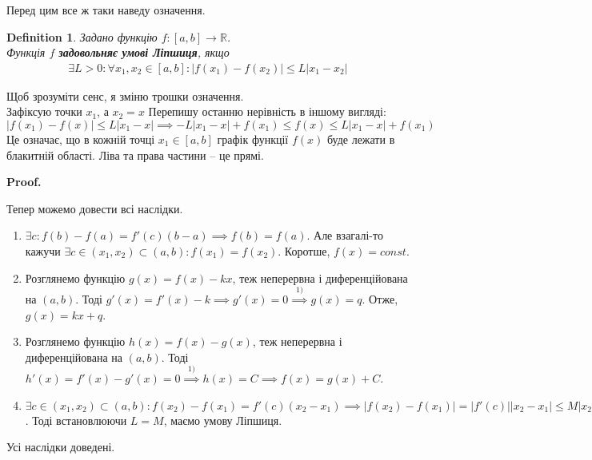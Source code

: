 \documentclass[a4paper, 14pt]{article}
\makeatletter
\def\qed{$\blacksquare$}
\theoremstyle{theoremdd}
\theoremstyle{theoremdd}
\newtheorem{definition}[theorem]{Definition}
\theoremstyle{theoremdd}
\theoremstyle{theoremdd}
\theoremstyle{theoremdd}
\theoremstyle{theoremdd}
\theoremstyle{theoremdd}
\theoremstyle{theoremdd}
\renewenvironment{proof}[1][Proof.\\]{\par
\pushQED{\hfill \qed}%
\normalfont \topsep6\p@\@plus6\p@\relax
\trivlist
\item\relax
{\bfseries
#1\@addpunct{.}}\hspace\labelsep\ignorespaces
}{%
\popQED\endtrivlist\@endpefalse
}
\makeatother
\begin{document}
Перед цим все ж таки наведу означення.
\begin{definition}
Задано функцію $f \colon [a,b] \to \mathbb{R}$.\\
Функція $f$ \textbf{задовольняє умові Ліпшиця}, якщо
\begin{align*}
\exists L > 0: \forall x_1,x_2 \in [a,b]: |f(x_1)-f(x_2)| \leq L|x_1-x_2|
\end{align*}
\end{definition}
Щоб зрозуміти сенс, я зміню трошки означення.\\
Зафіксую точки $x_1$, а $x_2 = x$ Перепишу останню нерівність в іншому вигляді:\\
$|f(x_1)-f(x)| \leq L|x_1-x| \implies -L|x_1-x|+f(x_1) \leq f(x) \leq L|x_1-x|+f(x_1) $\\
Це означає, що в кожній точці $x_1 \in [a,b]$ графік функції $f(x)$ буде лежати в блакитній області. Ліва та права частини -- це прямі.
\\ \iffalse %
\begin{figure}[H]
\centering
\begin{tikzpicture}[scale=0.8]
\draw[domain=-0.5:4.5, name path = A, samples=100, variable = \x] plot({\x},{3+abs(2-\x)});
\draw[domain=-0.5:4.5, name path = C, samples=100, variable = \x] plot({\x},{3-abs(2-\x)});

\draw[name path = B, white] (-0.5,5.5)--(-1,5.5)--(-3,5.5);
\draw[name path = D, white] (-0.5,0.5)--(-1,0)--(-3,0);
\tikzfillbetween[of=A and C]{blue, opacity = 0.3};
\tikzfillbetween[of=B and D]{blue, opacity = 0.3};
\draw (-0.5,0.5)--(-1,0);
\draw[red,domain=-3:4.5, variable = \x] plot({\x},{sqrt(\x*\x+5)});
\draw[thick,->] (0,0)--(0,5.5) node[anchor = south east] {$y$};
\draw[thick,->] (-3,0)--(4.5,0) node[anchor = north west] {$x$};
\end{tikzpicture}
\end{figure}
\fi %

\begin{proof}
Тепер можемо довести всі наслідки.
\begin{enumerate}[wide=0pt,label={\arabic*)}]
\item $\exists c: f(b)-f(a) = f'(c)(b-a) \implies f(b) = f(a)$. Але взагалі-то кажучи $\exists c \in (x_1,x_2) \subset (a,b): f(x_1) = f(x_2)$. Коротше, $f(x) = const$.
\item Розглянемо функцію $g(x) = f(x) - kx$, теж неперервна і диференційована на $(a,b)$. Тоді $g'(x) = f'(x) - k \implies g'(x) = 0 \overset{\text{1)}}{\implies} g(x) = q$. Отже, $g(x) = kx + q$.
\item Розглянемо функцію $h(x) = f(x) - g(x)$, теж неперервна і диференційована на $(a,b)$. Тоді $h'(x) = f'(x) - g'(x) = 0 \overset{\text{1)}}{\implies} h(x) = C \implies f(x) = g(x) + C$.
\item $\exists c \in (x_1,x_2) \subset (a,b): f(x_2)-f(x_1)=f'(c)(x_2-x_1) \implies |f(x_2)-f(x_1)|=|f'(c)||x_2-x_1| \leq M|x_2-x_1|$. Тоді встановлюючи $L=M$, маємо умову Ліпшиця.
\end{enumerate}
Усі наслідки доведені.
\end{proof}
\end{document}

